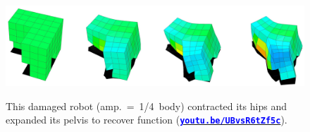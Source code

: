 \begin{figure}[h!]
\begin{center}
\includegraphics[trim={0 0 0 0},clip,width=\linewidth]{Chapter05/fig/splay.jpg}\\
\caption{\label{fig:splay}
This damaged robot (amp.~=~1/4~body) contracted its hips and expanded its pelvis to recover function
(\href{https://youtu.be/UBvsR6tZf5c}{\textcolor{blue}{\textbf{\texttt{youtu.be/UBvsR6tZf5c}}}}).
}
\vspace{-1em}
\end{center}
\end{figure}